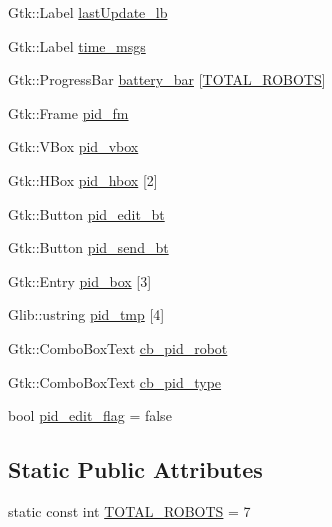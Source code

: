 \begin{DoxyCompactItemize}
\item 
Gtk\+::\+Label \hyperlink{class_control_g_u_i_afe6bb1a7eb11e33cfa1fe089c4bfcd2d}{last\+Update\+\_\+lb}
\item 
Gtk\+::\+Label \hyperlink{class_control_g_u_i_a2816137ab08d4362af2418e73e1dcfb3}{time\+\_\+msgs}
\item 
Gtk\+::\+Progress\+Bar \hyperlink{class_control_g_u_i_ae56d3e863c1aa99cddec69324a676d8f}{battery\+\_\+bar} \mbox{[}\hyperlink{class_control_g_u_i_a5a2c1a15c09444b56794705721ba73fa}{T\+O\+T\+A\+L\+\_\+\+R\+O\+B\+O\+TS}\mbox{]}
\item 
Gtk\+::\+Frame \hyperlink{class_control_g_u_i_a6dc582480dc8bb8bd5c83dbdf11f074e}{pid\+\_\+fm}
\item 
Gtk\+::\+V\+Box \hyperlink{class_control_g_u_i_ac99f046edb79dff4637bbcf0338fbd1a}{pid\+\_\+vbox}
\item 
Gtk\+::\+H\+Box \hyperlink{class_control_g_u_i_a66df69ebe9d1de15f6110d2832986000}{pid\+\_\+hbox} \mbox{[}2\mbox{]}
\item 
Gtk\+::\+Button \hyperlink{class_control_g_u_i_a25b5eb5bf471a963e86624d3fa2c39a7}{pid\+\_\+edit\+\_\+bt}
\item 
Gtk\+::\+Button \hyperlink{class_control_g_u_i_a9fd82366d82e0bc64dc58a31e10b4454}{pid\+\_\+send\+\_\+bt}
\item 
Gtk\+::\+Entry \hyperlink{class_control_g_u_i_ad442701491f6de30be3078a6795af07a}{pid\+\_\+box} \mbox{[}3\mbox{]}
\item 
Glib\+::ustring \hyperlink{class_control_g_u_i_aba421fd043ebac1c17826b47e5ac2bda}{pid\+\_\+tmp} \mbox{[}4\mbox{]}
\item 
Gtk\+::\+Combo\+Box\+Text \hyperlink{class_control_g_u_i_a3c7845eb8c0bddab5a9aa88fb9b8bd58}{cb\+\_\+pid\+\_\+robot}
\item 
Gtk\+::\+Combo\+Box\+Text \hyperlink{class_control_g_u_i_a8d26d0b3dae9b5ec2a36c9249739588d}{cb\+\_\+pid\+\_\+type}
\item 
bool \hyperlink{class_control_g_u_i_a28c8737ebe51274b23eaa55acad740a5}{pid\+\_\+edit\+\_\+flag} = false
\end{DoxyCompactItemize}
\subsection*{Static Public Attributes}
\begin{DoxyCompactItemize}
\item 
static const int \hyperlink{class_control_g_u_i_a5a2c1a15c09444b56794705721ba73fa}{T\+O\+T\+A\+L\+\_\+\+R\+O\+B\+O\+TS} = 7
\end{DoxyCompactItemize}


